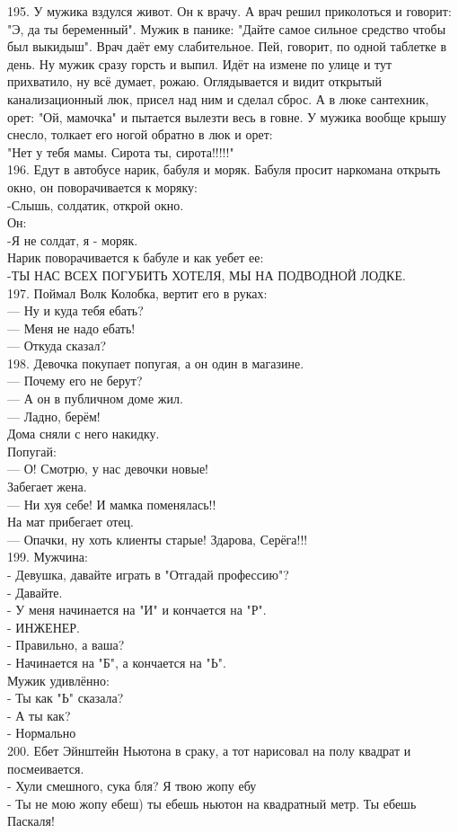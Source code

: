 \documentclass[a4paper,20pt,notitlepage]{extbook}
\begin{document}
	195. У мужика вздулся живот. Он к врачу. А врач решил приколоться и говорит: "Э, да ты беременный". Мужик в панике: "Дайте самое сильное средство чтобы был выкидыш". Врач даёт ему слабительное. Пей, говорит, по одной таблетке в день. Ну мужик сразу горсть и выпил. Идёт на измене по улице и тут прихватило, ну всё думает, рожаю. Оглядывается и видит открытый канализационный люк, присел над ним и сделал сброс. А в люке сантехник, орет: "Ой, мамочка" и пытается вылезти весь в говне. У мужика вообще крышу снесло, толкает его ногой обратно в люк и орет: \\
	"Нет у тебя мамы. Сирота ты, сирота!!!!!"\\
	
	196. Едут в автобусе нарик, бабуля и моряк. Бабуля просит наркомана открыть окно, он поворачивается к моряку:\\
	-Слышь, солдатик, открой окно.\\
	Он:\\
	-Я не солдат, я - моряк.\\
	Нарик поворачивается к бабуле и как уебет ее:\\
	-ТЫ НАС ВСЕХ ПОГУБИТЬ ХОТЕЛЯ, МЫ НА ПОДВОДНОЙ ЛОДКЕ.\\
	
	197. Поймал Волк Колобка, вертит его в руках:\\
	— Ну и куда тебя ебать?\\
	— Меня не надо ебать!\\
	— Откуда сказал?\\
	
	198. Девочка покупает попугая, а он один в магазине.\\
	— Почему его не берут?\\
	— А он в публичном доме жил.\\
	— Ладно, берём!\\
	Дома сняли с него накидку.\\
	Попугай:\\
	— О! Смотрю, у нас девочки новые!\\
	Забегает жена.\\
	— Ни хуя себе! И мамка поменялась!!\\
	На мат прибегает отец.\\
	— Опачки, ну хоть клиенты старые! Здарова, Серёга!!!\\
	
	199. Мужчина:\\
	- Девушка, давайте играть в "Отгадай профессию"?\\
	- Давайте.\\
	- У меня начинается на "И" и кончается на "Р".\\
	- ИНЖЕНЕР.\\
	- Правильно, а ваша?\\
	- Начинается на "Б", а кончается на "Ь".\\
	Мужик удивлённо:\\
	- Ты как "Ь" сказала?\\
	- А ты как?\\
	- Нормально\\
	
	200. Ебет Эйнштейн Ньютона в сраку, а тот нарисовал на полу квадрат и посмеивается.\\
	- Хули смешного, сука бля? Я твою жопу ебу\\
	- Ты не мою жопу ебеш) ты ебешь ньютон на квадратный метр. Ты ебешь Паскаля!
	
	
\end{document}
